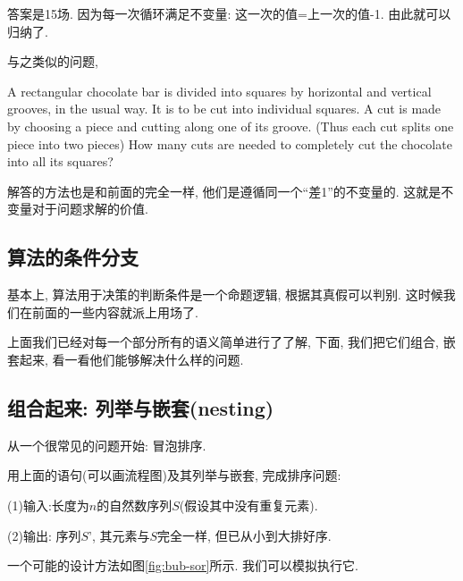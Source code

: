 答案是15场. 因为每一次循环满足不变量: 这一次的值=上一次的值-1. 由此就可以归纳了. 

与之类似的问题, 

\begin{prob}
	A rectangular chocolate bar is divided into squares by horizontal and vertical grooves, in the usual way. It is to be cut into individual squares. A cut is made by choosing a piece and cutting along one of its groove. (Thus each cut splits one piece into two pieces) How many cuts are needed to completely cut the chocolate into all its squares?
\end{prob}

解答的方法也是和前面的完全一样, 他们是遵循同一个``差1''的不变量的. 这就是不变量对于问题求解的价值. 


\subsection*{算法的条件分支}

基本上, 算法用于决策的判断条件是一个命题逻辑, 根据其真假可以判别. 这时候我们在前面的一些内容就派上用场了. 

上面我们已经对每一个部分所有的语义简单进行了了解, 下面, 我们把它们组合, 嵌套起来, 看一看他们能够解决什么样的问题. 

\subsection*{组合起来: 列举与嵌套(nesting)}

从一个很常见的问题开始: 冒泡排序. 

\begin{prob}
	用上面的语句(可以画流程图)及其列举与嵌套, 完成排序问题: 
	
	(1)输入:长度为$n$的自然数序列$S$(假设其中没有重复元素). 

	(2)输出: 序列$S’$, 其元素与$S$完全一样, 但已从小到大排好序.
\end{prob}

一个可能的设计方法如图\ref{fig:bub-sor}所示. 我们可以模拟执行它. 

